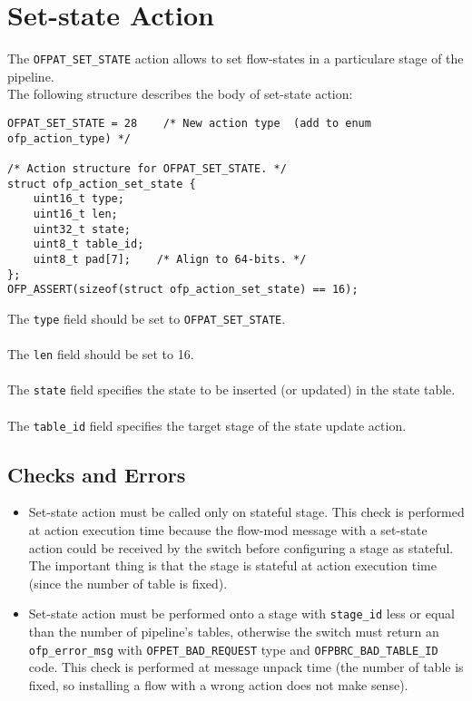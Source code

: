 \section{Set-state Action}
\label{sec:act_set_state_proto}

The \texttt{OFPAT\_SET\_STATE} action allows to set flow-states in a particulare stage of the pipeline.\\The following structure describes the body of set-state action:

\scriptsize
\begin{verbatim}
OFPAT_SET_STATE = 28    /* New action type  (add to enum ofp_action_type) */

/* Action structure for OFPAT_SET_STATE. */
struct ofp_action_set_state {
    uint16_t type;
    uint16_t len;
    uint32_t state;
    uint8_t table_id;
    uint8_t pad[7];    /* Align to 64-bits. */
};
OFP_ASSERT(sizeof(struct ofp_action_set_state) == 16);
\end{verbatim}
\normalsize
\noindent
The \texttt{type} field should be set to \texttt{OFPAT\_SET\_STATE}.
\\\\
The \texttt{len} field should be set to 16.
\\\\
The \texttt{state} field specifies the state to be inserted (or updated) in the state table.
\\\\
The \texttt{table\_id} field specifies the target stage of the state update action.

\subsection{Checks and Errors}

\begin{itemize}
\item Set-state action must be called only on stateful stage. This check is performed at action execution time because the flow-mod message with a set-state action could be received by the switch before configuring a stage as stateful. The important thing is that the stage is stateful at action execution time (since the number of table is fixed).

\item Set-state action must be performed onto a stage with \texttt{stage\_id} less or equal than the number of pipeline’s tables, otherwise the switch must return an \texttt{ofp\_error\_msg} with \texttt{OFPET\_BAD\_REQUEST} type and \texttt{OFPBRC\_BAD\_TABLE\_ID} code. This check is performed at message unpack time (the number of table is fixed, so installing a flow with a wrong action does not make sense).
\end{itemize}


